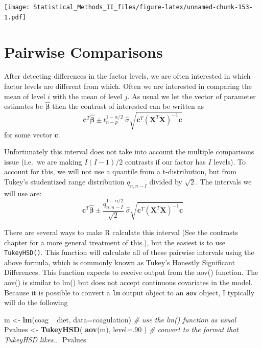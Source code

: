 \documentclass[]{book}
\newenvironment{Shaded}{\begin{snugshade}}{\end{snugshade}}
\newcommand{\KeywordTok}[1]{\textcolor[rgb]{0.13,0.29,0.53}{\textbf{{#1}}}}
\newcommand{\DataTypeTok}[1]{\textcolor[rgb]{0.13,0.29,0.53}{{#1}}}
\newcommand{\DecValTok}[1]{\textcolor[rgb]{0.00,0.00,0.81}{{#1}}}
\newcommand{\StringTok}[1]{\textcolor[rgb]{0.31,0.60,0.02}{{#1}}}
\newcommand{\CommentTok}[1]{\textcolor[rgb]{0.56,0.35,0.01}{\textit{{#1}}}}
\newcommand{\NormalTok}[1]{{#1}}
\theoremstyle{definition}
\theoremstyle{definition}
\theoremstyle{remark}
\begin{document}
\texttt{[image: Statistical\_Methods\_II\_files/figure-latex/unnamed-chunk-153-1.pdf]}

\section{Pairwise Comparisons}\label{pairwise-comparisons}

After detecting differences in the factor levels, we are often
interested in which factor levels are different from which. Often we are
interested in comparing the mean of level \(i\) with the mean of level
\(j\). As usual we let the vector of parameter estimates be
\(\hat{\boldsymbol{\beta}}\) then the contrast of interested can be
written as
\[\boldsymbol{c}^{T}\hat{\boldsymbol{\beta}}\pm t_{n-p}^{1-\alpha/2}\;\hat{\sigma}\sqrt{\boldsymbol{c}^{T}\left(\boldsymbol{X}^{T}\boldsymbol{X}\right)^{-1}\boldsymbol{c}}\]
for some vector \(\boldsymbol{c}\).

Unfortunately this interval does not take into account the multiple
comparisons issue (i.e.~we are making \(I(I-1)/2\) contrasts if our
factor has \(I\) levels). To account for this, we will not use a
quantile from a t-distribution, but from Tukey's studentized range
distribution \(q_{n,n-I}\) divided by \(\sqrt{2}\). The intervals we
will use are:
\[\boldsymbol{c}^{T}\hat{\boldsymbol{\beta}}\pm\frac{q_{n,n-I}^{1-\alpha/2}}{\sqrt{2}}\;\hat{\sigma}\sqrt{\boldsymbol{c}^{T}\left(\boldsymbol{X}^{T}\boldsymbol{X}\right)^{-1}\boldsymbol{c}}\]

There are several ways to make R calculate this interval (See the
contrasts chapter for a more general treatment of this.), but the
easiest is to use \texttt{TukeyHSD()}. This function will calculate all
of these pairwise intervals using the above formula, which is commonly
known as Tukey's Honestly Significant Differences. This function expects
to receive output from the aov() function. The aov() is similar to lm()
but does not accept continuous covariates in the model. Because it is
possible to convert a \texttt{lm} output object to an \texttt{aov}
object, I typically will do the following

\begin{Shaded}
\begin{Highlighting}[]
\NormalTok{m <-}\StringTok{ }\KeywordTok{lm}\NormalTok{(coag ~}\StringTok{ }\NormalTok{diet, }\DataTypeTok{data=}\NormalTok{coagulation)   }\CommentTok{# use the lm() function as usual}
\NormalTok{Pvalues <-}\StringTok{ }\KeywordTok{TukeyHSD}\NormalTok{( }\KeywordTok{aov}\NormalTok{(m), }\DataTypeTok{level=}\NormalTok{.}\DecValTok{90} \NormalTok{) }\CommentTok{# convert to the format that TukeyHSD likes...}
\NormalTok{Pvalues}
\end{Highlighting}
\end{Shaded}
\end{document}
